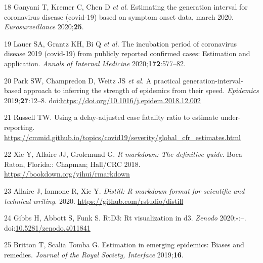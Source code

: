 \documentclass[
]{article}
\begin{document}
\leavevmode\hypertarget{ref-generationinterval}{}%
18 Ganyani T, Kremer C, Chen D \emph{et al.} Estimating the generation
interval for coronavirus disease (covid-19) based on symptom onset data,
march 2020. \emph{Eurosurveillance} 2020;\textbf{25}.

\leavevmode\hypertarget{ref-incubationperiod}{}%
19 Lauer SA, Grantz KH, Bi Q \emph{et al.} The incubation period of
coronavirus disease 2019 (covid-19) from publicly reported confirmed
cases: Estimation and application. \emph{Annals of Internal Medicine}
2020;\textbf{172}:577--82.

\leavevmode\hypertarget{ref-Park2019}{}%
20 Park SW, Champredon D, Weitz JS \emph{et al.} A practical
generation-interval-based approach to inferring the strength of
epidemics from their speed. \emph{Epidemics} 2019;\textbf{27}:12--8.
doi:\href{https://doi.org/https://doi.org/10.1016/j.epidem.2018.12.002}{https://doi.org/10.1016/j.epidem.2018.12.002}

\leavevmode\hypertarget{ref-Russell:BFVkJ6lQ}{}%
21 Russell TW. Using a delay-adjusted case fatality ratio to estimate
under-reporting.
\url{https://cmmid.github.io/topics/covid19/severity/global_cfr_estimates.html}

\leavevmode\hypertarget{ref-rmarkdown}{}%
22 Xie Y, Allaire JJ, Grolemund G. \emph{R markdown: The definitive
guide}. Boca Raton, Florida:: Chapman; Hall/CRC 2018.
\url{https://bookdown.org/yihui/rmarkdown}

\leavevmode\hypertarget{ref-distill}{}%
23 Allaire J, Iannone R, Xie Y. \emph{Distill: R markdown format for
scientific and technical writing}. 2020.
\url{https://github.com/rstudio/distill}

\leavevmode\hypertarget{ref-rtd3}{}%
24 Gibbs H, Abbott S, Funk S. RtD3: Rt visualization in d3.
\emph{Zenodo} 2020;\textbf{-}:--.
doi:\href{https://doi.org/10.5281/zenodo.4011841}{10.5281/zenodo.4011841}

\leavevmode\hypertarget{ref-Britton:2019gf}{}%
25 Britton T, Scalia Tomba G. Estimation in emerging epidemics: Biases
and remedies. \emph{Journal of the Royal Society, Interface}
2019;\textbf{16}.
\end{document}
